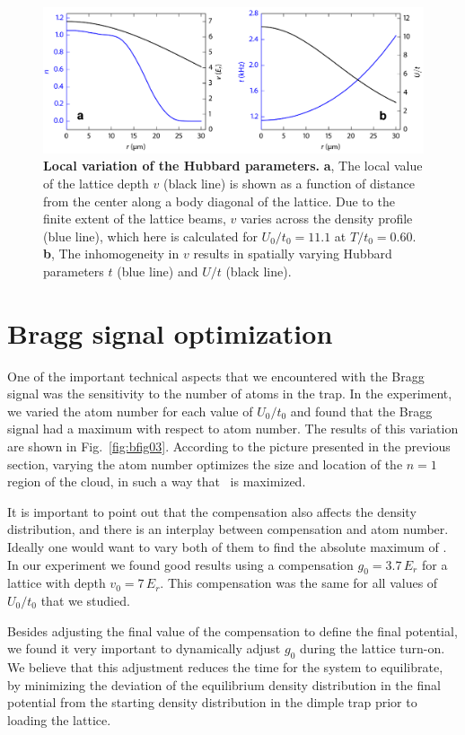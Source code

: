 \begin{figure}
\centering \includegraphics[width=125mm]{../figures/afmpaper/local-Hubbard.png}
\caption{\textbf{Local variation of the Hubbard parameters.}
\textbf{a}, The local value of the lattice depth $v$ (black line) is shown as a
function of distance from the center along a body diagonal of the lattice.  Due
to the finite extent of the lattice beams, $v$ varies across the density
profile (blue line),  which here is calculated for
$U_{0}/t_{0}=11.1$ at $T/t_{0}=0.60$.  \textbf{b},  The inhomogeneity in $v$
results in spatially varying Hubbard parameters $t$ (blue line) and $U/t$
(black line).} 
\label{fig:comp-inhomog}
\end{figure}

\section{Bragg signal optimization} 
\label{sec:number-vary}

One of the important technical aspects that we encountered with the Bragg
signal was the sensitivity to the number of atoms in the trap.  In the
experiment, we varied the atom number for each value of $U_{0}/t_{0}$ and found
that the Bragg signal had a maximum with respect to atom number.   The results
of this variation are shown in Fig.~\ref{fig:bfig03}.   According to the
picture presented in the previous section, varying the atom number optimizes
the size and location of the $n=1$ region of the cloud, in such a way that
\sPi\ is maximized.  

It is important to point out that the compensation also affects the density
distribution,  and there is an interplay between compensation and atom number.
Ideally one would want to vary both of them to find the absolute maximum of
\sPi.  In our experiment we found good results using a compensation
$g_{0}=3.7\,E_{r}$ for a lattice with depth $v_{0}=7\,E_{r}$.  This
compensation was the same for all values of $U_{0}/t_{0}$ that we studied.  

Besides adjusting the final value of the compensation to define the final
potential, we found it very important to dynamically adjust $g_{0}$ during the
lattice turn-on.  We believe that  this  adjustment reduces the time for the
system to equilibrate, by minimizing the deviation of the equilibrium density
distribution in the final potential from the starting density distribution in
the dimple trap prior to loading the lattice.   

